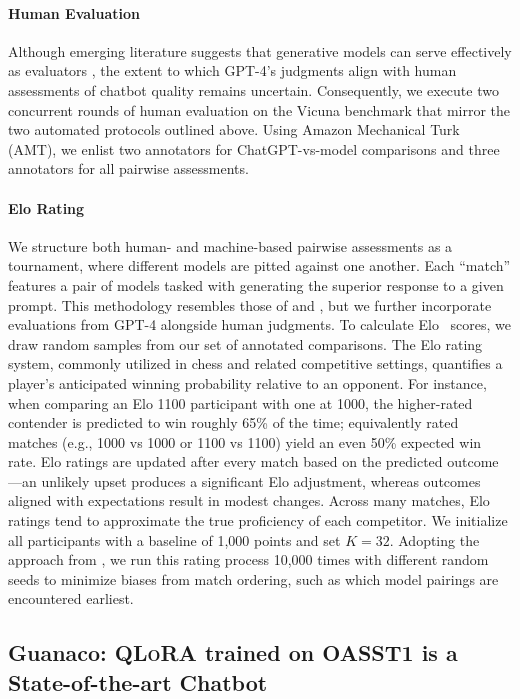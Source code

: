 \paragraph{Human Evaluation} Although emerging literature suggests that generative models can serve effectively as evaluators \citep{fu2023gptscore}, the extent to which GPT-4’s judgments align with human assessments of chatbot quality remains uncertain. Consequently, we execute two concurrent rounds of human evaluation on the Vicuna benchmark that mirror the two automated protocols outlined above. Using Amazon Mechanical Turk (AMT), we enlist two annotators for ChatGPT-vs-model comparisons and three annotators for all pairwise assessments.

\paragraph{Elo Rating} We structure both human- and machine-based pairwise assessments as a tournament, where different models are pitted against one another. Each “match” features a pair of models tasked with generating the superior response to a given prompt. This methodology resembles those of \citet{bai2022training} and \citet{vicuna2023}, but we further incorporate evaluations from GPT-4 alongside human judgments. To calculate Elo~\citep{elo1967proposed,elo1978rating} scores, we draw random samples from our set of annotated comparisons. The Elo rating system, commonly utilized in chess and related competitive settings, quantifies a player's anticipated winning probability relative to an opponent. For instance, when comparing an Elo 1100 participant with one at 1000, the higher-rated contender is predicted to win roughly 65\% of the time; equivalently rated matches (e.g., 1000 vs 1000 or 1100 vs 1100) yield an even 50\% expected win rate. Elo ratings are updated after every match based on the predicted outcome—an unlikely upset produces a significant Elo adjustment, whereas outcomes aligned with expectations result in modest changes. Across many matches, Elo ratings tend to approximate the true proficiency of each competitor. We initialize all participants with a baseline of 1,000 points and set $K=32$. Adopting the approach from \citet{vicuna2023}, we run this rating process 10,000 times with different random seeds to minimize biases from match ordering, such as which model pairings are encountered earliest.

\subsection{\textbf{Guanaco}: \textsc{QLoRA} trained on OASST1 is a State-of-the-art Chatbot}

